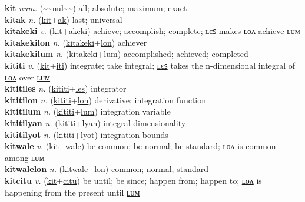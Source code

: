 \textbf{kit} \textit{num.} (\hyperref[nul]{\~{}\~{}nul\~{}\~{}})
all; absolute; maximum; exact \label{kit} \\
\textbf{kitak} \textit{n.} (\hyperref[kit]{kit}+\hyperref[ak]{ak})
last; universal \label{kitak} \\
\textbf{kitakeki} \textit{v.} (\hyperref[kit]{kit}+\hyperref[akeki]{akeki})
achieve; accomplish; complete; ʟєꜱ makes \hyperref[kitakekilon]{ʟᴏᴧ} achieve \hyperref[kitakekilum]{ʟᴜᴍ} \label{kitakeki} \\
\textbf{kitakekilon} \textit{n.} (\hyperref[kitakeki]{kitakeki}+\hyperref[lon]{lon})
achiever \label{kitakekilon} \\
\textbf{kitakekilum} \textit{n.} (\hyperref[kitakeki]{kitakeki}+\hyperref[lum]{lum})
accomplished; achieved; completed \label{kitakekilum} \\
\textbf{kititi} \textit{v.} (\hyperref[kit]{kit}+\hyperref[iti]{iti})
integrate; take integral; \hyperref[kititiles]{ʟєꜱ} takes the n-dimensional integral of \hyperref[kititilon]{ʟᴏᴧ} over \hyperref[kititilum]{ʟᴜᴍ} \label{kititi} \\
\textbf{kititiles} \textit{n.} (\hyperref[kititi]{kititi}+\hyperref[les]{les})
integrator \label{kititiles} \\
\textbf{kititilon} \textit{n.} (\hyperref[kititi]{kititi}+\hyperref[lon]{lon})
derivative; integration function \label{kititilon} \\
\textbf{kititilum} \textit{n.} (\hyperref[kititi]{kititi}+\hyperref[lum]{lum})
integration variable \label{kititilum} \\
\textbf{kititilyan} \textit{n.} (\hyperref[kititi]{kititi}+\hyperref[lyan]{lyan})
integral dimensionality \label{kititilyan} \\
\textbf{kititilyot} \textit{n.} (\hyperref[kititi]{kititi}+\hyperref[lyot]{lyot})
integration bounds \label{kititilyot} \\
\textbf{kitwale} \textit{v.} (\hyperref[kit]{kit}+\hyperref[wale]{wale})
be common; be normal; be standard; \hyperref[kitwalelon]{ʟᴏᴧ} is common among ʟᴜᴍ \label{kitwale} \\
\textbf{kitwalelon} \textit{n.} (\hyperref[kitwale]{kitwale}+\hyperref[lon]{lon})
common; normal; standard \label{kitwalelon} \\
\textbf{kitcitu} \textit{v.} (\hyperref[kit]{kit}+\hyperref[citu]{citu})
be until; be since; happen from; happen to; \hyperref[kitcitulon]{ʟᴏᴧ} is happening from the present until \hyperref[kitcitulum]{ʟᴜᴍ} \label{kitcitu} \\
